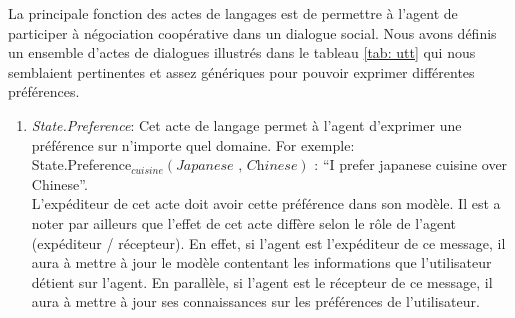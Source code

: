 \documentclass[a4paper,french]{article}
\begin{document}
\par La principale fonction des actes de langages est de permettre à l'agent de participer à négociation coopérative dans un dialogue social. Nous avons définis un ensemble d'actes de dialogues  illustrés dans le tableau \ref{tab: utt} qui nous semblaient pertinentes et assez génériques  pour pouvoir exprimer différentes préférences. 
\begin{enumerate}
		\item  \textit{State.Preference}: Cet acte de langage permet à l'agent d'exprimer une préférence sur n'importe quel domaine. For exemple: \\ State.Preference$_{cuisine}(\textit{Japanese , Chinese})$ : ``I prefer japanese cuisine over Chinese''. 
		\\ L'expéditeur de cet acte doit avoir cette préférence dans son modèle. Il est a noter par ailleurs que l'effet de cet acte diffère selon le rôle de l'agent (expéditeur / récepteur). En effet, si l'agent est l'expéditeur de ce message, il aura à mettre à jour le modèle contentant les informations que l'utilisateur détient sur l'agent. En parallèle, si l'agent est le récepteur de ce message, il aura à mettre à jour ses connaissances sur les préférences de l'utilisateur. 


\end{enumerate}
\end{document}
